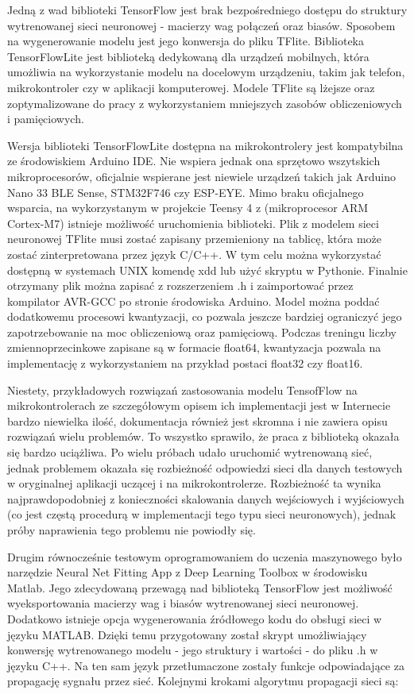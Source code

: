 \documentclass[12pt, a4paper]{article}
\begin{document}
Jedną z wad biblioteki TensorFlow jest brak bezpośredniego dostępu do struktury wytrenowanej sieci neuronowej - macierzy wag połączeń oraz biasów. Sposobem na wygenerowanie modelu jest jego konwersja do pliku TFlite. Biblioteka TensorFlowLite jest biblioteką dedykowaną dla urządzeń mobilnych, która umożliwia na wykorzystanie modelu na docelowym urządzeniu, takim jak telefon, mikrokontroler czy w aplikacji komputerowej. Modele TFlite są lżejsze oraz zoptymalizowane do pracy z wykorzystaniem mniejszych zasobów obliczeniowych i pamięciowych.

Wersja biblioteki TensorFlowLite dostępna na mikrokontrolery jest kompatybilna ze środowiskiem Arduino IDE. Nie wspiera jednak ona sprzętowo wszytskich mikroprocesorów, oficjalnie wspierane jest niewiele urządzeń takich jak Arduino Nano 33 BLE Sense, STM32F746 czy ESP-EYE. Mimo braku oficjalnego wsparcia, na wykorzystanym w projekcie Teensy 4 z (mikroprocesor ARM Cortex-M7) istnieje możliwość uruchomienia biblioteki. Plik z modelem sieci neuronowej TFlite musi zostać zapisany przemieniony na tablicę, która może zostać zinterpretowana przez język C/C++. W tym celu można wykorzystać dostępną w systemach UNIX komendę xdd lub użyć skryptu w Pythonie. Finalnie otrzymany plik można zapisać z rozszerzeniem .h i zaimportować przez kompilator AVR-GCC po stronie środowiska Arduino. Model można poddać dodatkowemu procesowi kwantyzacji, co pozwala jeszcze bardziej ograniczyć jego zapotrzebowanie na moc obliczeniową oraz pamięciową. Podczas treningu liczby zmiennoprzecinkowe zapisane są w formacie float64, kwantyzacja pozwala na implementację z wykorzystaniem na przykład postaci float32 czy float16.

Niestety, przykładowych rozwiązań zastosowania modelu TensofFlow na mikrokontrolerach ze szczegółowym opisem ich implementacji jest w Internecie bardzo niewielka ilość, dokumentacja również jest skromna i nie zawiera opisu rozwiązań wielu problemów. To wszystko sprawiło, że praca z biblioteką okazała się bardzo uciążliwa. Po wielu próbach udało uruchomić wytrenowaną sieć, jednak problemem okazała się rozbieżność odpowiedzi sieci dla danych testowych w oryginalnej aplikacji uczącej i na mikrokontrolerze. Rozbieżność ta wynika najprawdopodobniej z konieczności skalowania danych wejściowych i wyjściowych (co jest częstą procedurą w implementacji tego typu sieci neuronowych), jednak próby naprawienia tego problemu nie powiodły się. 

Drugim równocześnie testowym oprogramowaniem do uczenia maszynowego było narzędzie Neural Net Fitting App z Deep Learning Toolbox w środowisku Matlab. Jego zdecydowaną przewagą nad biblioteką TensorFlow jest możliwość wyeksportowania macierzy wag i biasów wytrenowanej sieci neuronowej. Dodatkowo istnieje opcja wygenerowania źródłowego kodu do obsługi sieci w języku MATLAB. Dzięki temu przygotowany został skrypt umożliwiający konwersję wytrenowanego modelu - jego struktury i wartości - do pliku .h w języku C++. Na ten sam język przetłumaczone zostały funkcje odpowiadające za propagację sygnału przez sieć. Kolejnymi krokami algorytmu propagacji sieci są:
\end{document}
